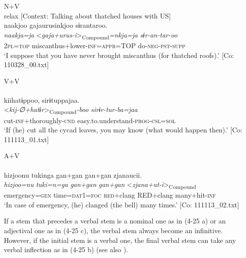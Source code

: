 \ea \label{ex:4.25} \ea  N+V \label{ex:4.25a}\\relax
    [Context: Talking about thatched houses with US]\\
\glll   naakjoo  gajaurusinkjoo  sɨrantaroo.\\
      \textit{naakja=ja}  <\textit{gaja+urus-i}>\textsubscript{Compound}\textit{=nkja=ja}  \textit{sɨr-an-tar-oo}\\
      2\textsc{pl}=\textsc{top}  miscanthus+lower-\textsc{inf}=\textsc{appr}=TOP  do-\textsc{neg}-\textsc{pst}-\textsc{supp}\\
      \glt       ‘I suppose that you have never brought miscanthus (for thatched roofs).’ [Co: 110328\_00.txt]

\ex  V+V\\\\
\glll     kiihatɨppoo,  sirɨtuppajaa.\\
      <\textit{kij-∅+hatɨr}>\textsubscript{Compound}\textit{{}-boo  sirɨr-tur-ba=jaa}\\
      cut-\textsc{inf}+thoroughly-\textsc{cnd}  easy.to.understand-\textsc{prog}-\textsc{csl}=\textsc{sol}\\
    \glt       ‘If (he) cut all the cycad leaves, you may know (what would happen then).’ [Co: 111113\_01.txt]

\ex A+V\\\\
\glll    {\textbar}hizjoo{\textbar}nu  tukinga  gan+gan  gan+gan    zjanaucii.\\
      \textit{hizjoo=nu}  \textit{tuki=n=ga}  \textit{gan+gan}  \textit{gan+gan}   <\textit{zjana+ut-i}>\textsubscript{Compound}\\
      emergency=\textsc{gen}  time=\textsc{dat}1=\textsc{foc}  \textsc{red}+clang  RED+clang     many+hit-\textsc{inf}    \\
    \glt       ‘In case of emergency, (he) clanged (the bell) many times.’ [Co: 111113\_02.txt]
    \z
\z

If a stem that precedes a verbal stem is a nominal one as in (4-25 a) or an adjectival one as in (4-25 c), the verbal stem always become an infinitive. However, if the initial stem is a verbal one, the final verbal stem can take any verbal inflection as in (4-25 b) (see also ).

